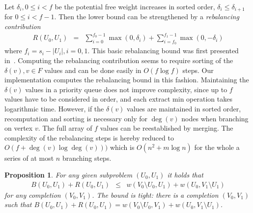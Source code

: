 \documentclass[a4paper,11pt]{article}
\newtheorem{proposition}{Proposition}
\begin{document}
Let $\delta_i, 0\leq i<f$ be the potential free weight increases in
sorted order, $\delta_i\leq \delta_{i+1}$ for $0\leq i<f-1$. Then the
lower bound can be strengthened by a \emph{rebalancing contribution}
\begin{eqnarray*}
R(U_0,U_1) & = & 
\sum_{i=0}^{f_0-1}\max(0,\delta_i)+\sum_{i=f_0}^{f_1-1}\max(0,-\delta_i)
\end{eqnarray*}
where $f_i=s_i-|U_i|, i=0,1$. This basic rebalancing bound was first
presented in~\cite{Traff91:or,Traff94:ppl}. Computing the rebalancing
contribution seems to require sorting of the $\delta(v), v\in F$
values and can be done easily in $O(f\log f)$ steps. Our
implementation computes the rebalancing bound in this
fashion. Maintaining the $\delta(v)$ values in a priority queue does
not improve complexity, since up to $f$ values have to be considered
in order, and each extract min operation takes logarithmic
time. However, if the $\delta(v)$ values are maintained in sorted
order, recomputation and sorting is necessary only for $\deg(v)$ nodes
when branching on vertex $v$. The full array of $f$ values can be
reestablished by merging. The complexity of the rebalancing steps is
hereby reduced to $O(f+\deg(v)\log\deg(v)))$ which is $O(n^2+m\log n)$
for the whole a series of at most $n$ branching steps.

\begin{proposition}
\label{prop:rebalancing}
For any given subproblem $(U_0,U_1)$ it holds that
\begin{eqnarray*}
B(U_0,U_1)+R(U_0,U_1) & \leq & 
w(V_0\setminus U_0,U_1)+w(U_0,V_1\setminus U_1)
\end{eqnarray*}
for any completion $(V_0,V_1)$. The bound is \emph{tight}: there is a
completion $(V_0,V_1)$ such that $B(U_0,U_1)+R(U_0,U_1) =
w(V_0\setminus U_0,V_1)+w(U_0,V_1\setminus U_1)$.
\end{proposition}
\end{document}
